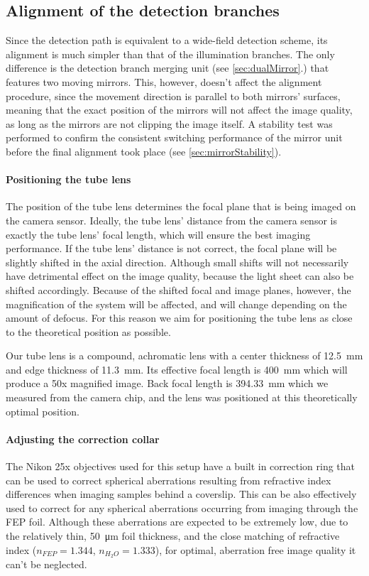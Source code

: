   \subsection{Alignment of the detection branches}
    Since the detection path is equivalent to a wide-field detection scheme, its alignment is much simpler than that of the illumination branches. The only difference is the detection branch merging unit (see \autoref{sec:dualMirror}.) that features two moving mirrors. This, however, doesn't affect the alignment procedure, since the movement direction is parallel to both mirrors' surfaces, meaning that the exact position of the mirrors will not affect the image quality, as long as the mirrors are not clipping the image itself. A stability test was performed to confirm the consistent switching performance of the mirror unit before the final alignment took place (see \autoref{sec:mirrorStability}).


    \paragraph{Positioning the tube lens}
      The position of the tube lens determines the focal plane that is being imaged on the camera sensor. Ideally, the tube lens' distance from the camera sensor is exactly the tube lens' focal length, which will ensure the best imaging performance. If the tube lens' distance is not correct, the focal plane will be slightly shifted in the axial direction. Although small shifts will not necessarily have detrimental effect on the image quality, because the light sheet can also be shifted accordingly. Because of the shifted focal and image planes, however, the magnification of the system will be affected, and will change depending on the amount of defocus. For this reason we aim for positioning the tube lens as close to the theoretical position as possible.

      Our tube lens is a compound, achromatic lens with a center thickness of \SI{12.5}{mm} and edge thickness of \SI{11.3}{mm}. Its effective focal length is \SI{400}{mm} which will produce a 50x magnified image. Back focal length is \SI{394.33}{mm} which we measured from the camera chip, and the lens was positioned at this theoretically optimal position.

    \paragraph{Adjusting the correction collar}
      The Nikon 25x objectives used for this setup have a built in correction ring that can be used to correct spherical aberrations resulting from refractive index differences when imaging samples behind a coverslip. This can be also effectively used to correct for any spherical aberrations occurring from imaging through the FEP foil. Although these aberrations are expected to be extremely low, due to the relatively thin, \SI{50}{\micro m} foil thickness, and the close matching of refractive index ($n_{FEP} = 1.344$, $n_{H_2O}=1.333$), for optimal, aberration free image quality it can't be neglected.

